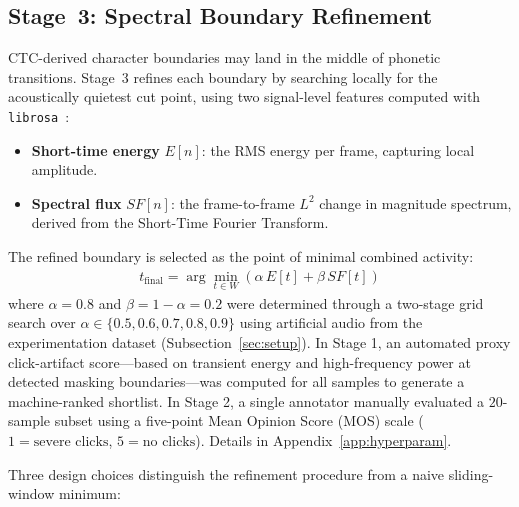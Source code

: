 \documentclass[cameraready]{Interspeech}
\begin{document}
\subsection{Stage~3: Spectral Boundary Refinement}

CTC-derived character boundaries may land in the middle of phonetic transitions. Stage~3 refines each boundary by searching locally for the acoustically quietest cut point, using two signal-level features computed with \texttt{librosa}~\cite{mcfee2015librosa}:
%
\begin{itemize}
    \item \textbf{Short-time energy} $E[n]$: the RMS energy per frame, capturing local amplitude.
    \item \textbf{Spectral flux} $SF[n]$: the frame-to-frame $L^2$ change in magnitude spectrum, derived from the Short-Time Fourier Transform.
\end{itemize}
%
The refined boundary is selected as the point of minimal combined activity:
%
\begin{align}
  t_{\mathrm{final}} = \arg\min_{t \in W}\left(\alpha\, E[t] + \beta\, SF[t]\right)
  \label{eq:boundary}
\end{align}
%
where $\alpha = 0.8$ and $\beta = 1 - \alpha = 0.2$ were determined through a two-stage grid search over $\alpha \in \{0.5, 0.6, 0.7, 0.8, 0.9\}$ using artificial audio from the experimentation dataset (Subsection~\ref{sec:setup}). In Stage 1, an automated proxy click-artifact score---based on transient energy and high-frequency power at detected masking boundaries---was computed for all samples to generate a machine-ranked shortlist. In Stage 2, a single annotator manually evaluated a $20$-sample subset using a five-point Mean Opinion Score (MOS) scale ($1 = \text{severe clicks}$, $5 = \text{no clicks}$). Details in Appendix~\ref{app:hyperparam}.

Three design choices distinguish the refinement procedure from a naive sliding-window minimum:
\end{document}
